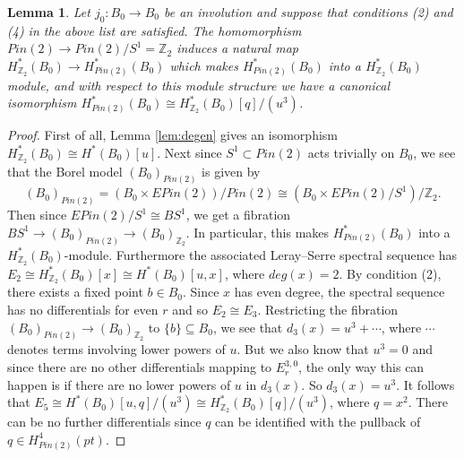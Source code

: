\documentclass{amsart}
\newtheorem{lemma}[theorem]{Lemma}
\theoremstyle{definition}
\theoremstyle{remark}
\numberwithin{equation}{section}
\begin{document}
\begin{lemma}\label{lem:q}
Let $j_0 : B_0 \to B_0$ be an involution and suppose that conditions (2) and (4) in the above list are satisfied. The homomorphism $Pin(2) \to Pin(2)/S^1 = \mathbb{Z}_2$ induces a natural map $H^*_{\mathbb{Z}_2}(B_0) \to H^*_{Pin(2)}(B_0)$ which makes $H^*_{Pin(2)}(B_0)$ into a $H^*_{\mathbb{Z}_2}(B_0)$ module, and with respect to this module structure we have a canonical isomorphism $H^*_{Pin(2)}(B_0) \cong H^*_{\mathbb{Z}_2}(B_0)[q]/(u^3)$.
\end{lemma}
\begin{proof}
First of all, Lemma \ref{lem:degen} gives an isomorphism $H^*_{\mathbb{Z}_2}(B_0) \cong H^*(B_0)[u]$. Next since $S^1 \subset Pin(2)$ acts trivially on $B_0$, we see that the Borel model $(B_0)_{Pin(2)}$ is given by
\[
(B_0)_{Pin(2)} = (B_0 \times EPin(2))/Pin(2) \cong (B_0 \times EPin(2)/S^1)/\mathbb{Z}_2.
\]
Then since $EPin(2)/S^1 \cong BS^1$, we get a fibration $BS^1 \to (B_0)_{Pin(2)} \to (B_0)_{\mathbb{Z}_2}$. In particular, this makes $H^*_{Pin(2)}(B_0)$ into a $H^*_{\mathbb{Z}_2}(B_0)$-module. Furthermore the associated Leray--Serre spectral sequence has $E_2 \cong H^*_{\mathbb{Z}_2}(B_0)[x] \cong H^*(B_0)[u,x]$, where $deg(x) = 2$. By condition (2), there exists a fixed point $b \in B_0$. Since $x$ has even degree, the spectral sequence has no differentials for even $r$ and so $E_2 \cong E_3$. Restricting the fibration $(B_0)_{Pin(2)} \to (B_0)_{\mathbb{Z}_2}$ to $\{ b \} \subseteq B_0$, we see that $d_3(x) = u^3 + \cdots $, where $\cdots $ denotes terms involving lower powers of $u$. But we also know that $u^3 = 0$ and since there are no other differentials mapping to $E_r^{3,0}$, the only way this can happen is if there are no lower powers of $u$ in $d_3(x)$. So $d_3(x) = u^3$. It follows that $E_5 \cong H^*(B_0)[u,q]/(u^3) \cong H^*_{\mathbb{Z}_2}(B_0)[q]/(u^3)$, where $q = x^2$. There can be no further differentials since $q$ can be identified with the pullback of $q \in H^4_{Pin(2)}(pt)$.
\end{proof}
\end{document}
